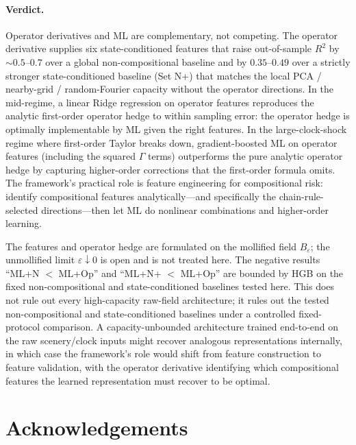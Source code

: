 \documentclass[11pt,reqno]{amsart}
\theoremstyle{plain}
\theoremstyle{definition}
\theoremstyle{remark}
\newcommand{\Bvar}{B}
\begin{document}
\paragraph{Verdict.}
Operator derivatives and ML are complementary, not competing.
The operator derivative supplies six state-conditioned features
that raise out-of-sample $R^{2}$ by $\sim 0.5$--$0.7$ over a
global non-compositional baseline and by $0.35$--$0.49$ over a
strictly stronger state-conditioned baseline (Set N+) that
matches the local PCA / nearby-grid / random-Fourier capacity
without the operator directions. In the mid-regime, a linear
Ridge regression on operator features reproduces the analytic
first-order operator hedge to within sampling error: the
operator hedge is optimally implementable by ML given the
right features. In the large-clock-shock regime where
first-order Taylor breaks down, gradient-boosted ML on
operator features (including the squared $\Gamma$ terms)
outperforms the pure analytic operator hedge by capturing
higher-order corrections that the first-order formula omits.
The framework's practical role is feature engineering for
compositional risk: identify compositional features
analytically---and specifically the chain-rule-selected
directions---then let ML do nonlinear combinations and
higher-order learning.

\medskip

The features and operator hedge are formulated on the mollified
field $\Bvar_{\varepsilon}$; the unmollified limit
$\varepsilon\downarrow 0$ is open and is not treated here. The
negative results ``ML+N $<$ ML+Op'' and ``ML+N+ $<$ ML+Op'' are
bounded by HGB on the fixed non-compositional and
state-conditioned baselines tested here. This does not rule out
every high-capacity raw-field architecture; it rules out the
tested non-compositional and state-conditioned baselines under a
controlled fixed-protocol comparison. A capacity-unbounded
architecture trained end-to-end on the raw scenery/clock inputs
might recover analogous representations internally, in which
case the framework's role would shift from feature construction
to feature validation, with the operator derivative identifying
which compositional features the learned representation must
recover to be optimal.

\section*{Acknowledgements}
\end{document}

